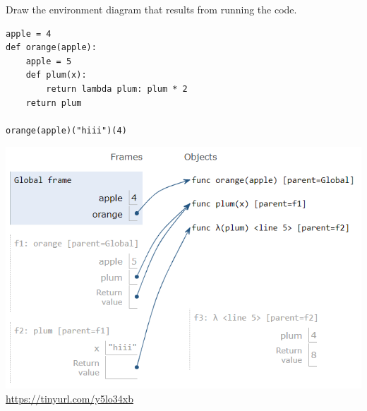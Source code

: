 \begin{blocksection}
\question Draw the environment diagram that results from running the code.

\begin{lstlisting}
apple = 4
def orange(apple):
    apple = 5
    def plum(x):
        return lambda plum: plum * 2
    return plum

orange(apple)("hiii")(4)
\end{lstlisting}

\begin{solution}[2in]
\includegraphics[scale=0.5]{apple.png}
\\
\url{https://tinyurl.com/y5lo34xb}
\end{solution}
\end{blocksection}

    